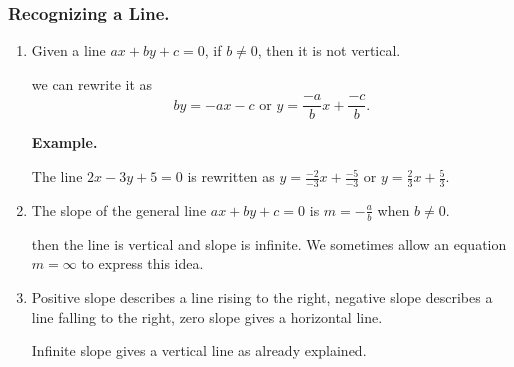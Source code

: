 \begin{frame}
 
    \frametitle{Recognizing a Line.} 


    \begin{enumerate}%
 \item  Given a line $ax+by+c=0$, if $b\neq 0$, then it is not vertical.
 
  we can rewrite it as 
 $$by=-ax-c \mbox{ or } y=\frac{-a}{b}x+\frac{-c}{b}.$$
 
 {\bf Example.}
 
 The line $2x-3y+5=0$ is rewritten as $\displaystyle y=\frac{-2}{-3}x+\frac{-5}{-3}$
 or $\displaystyle y=\frac{2}{3}x+\frac{5}{3}.$
 
 \item The slope of the general line $ax+by+c=0$ is $m=-\frac{a}{b}$ when $b\neq 0$. 
 
  then the line is vertical and slope is infinite. We sometimes allow an equation 
 $m=\infty$ to express this idea.
 
 
 \item Positive slope describes a line rising to the right, negative slope describes a line falling to the right, 
 zero slope gives a horizontal line.
 
 Infinite slope gives a vertical line as already explained.

 
 
    \end{enumerate}
 
\end{frame}

